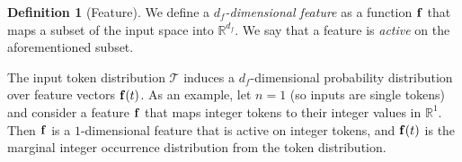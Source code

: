 \documentclass{article} %
\DeclareRobustCommand{\revOne}[1]{#1}
\theoremstyle{plain}
\theoremstyle{definition}
\newtheorem{definition}{Definition}
\newcommand{\josh}[1]{{\color{orange}{\bf Josh:} #1}}
\begin{document}
\begin{definition}[Feature]\label{def:feature}We define a {\it $d_f$-dimensional feature} as a function ${\mathbf f}$ that maps a subset of the input \revOne{space into $\mathbb{R}^{d_f}$}. We say that a feature is {\it active} on the aforementioned subset.
\end{definition}




The input token distribution \revOne{$\mathcal{T}$ induces a $d_f$-dimensional probability distribution over feature vectors ${\mathbf f}(t)$}. As an example, let $n = 1$ (so inputs are single tokens) and consider a feature ${\mathbf f}$ that maps integer tokens to their integer values in $\mathbb{R}^1$. Then ${\mathbf f}$ is a $1$-dimensional feature that is active on integer tokens, and ${\mathbf f}(t)$ is the marginal integer occurrence distribution from the token distribution.
\end{document}

